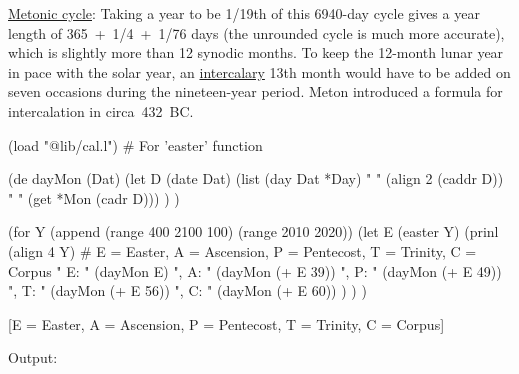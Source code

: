 \begin{itemize}
\href{http://en.wikipedia.org/wiki/Metonic\_cycle}{Metonic cycle}:
Taking a year to be 1/19th of this 6940-day cycle gives a year length of
365~+~1/4~+~1/76 days (the unrounded cycle is much more accurate), which
is slightly more than 12 synodic months. To keep the 12-month lunar year
in pace with the solar year, an
\href{http://en.wikipedia.org/wiki/intercalary}{intercalary} 13th month
would have to be added on seven occasions during the nineteen-year
period. Meton introduced a formula for intercalation in circa~432~BC.


\begin{wideverbatim}

(load "@lib/cal.l")  # For 'easter' function

(de dayMon (Dat)
   (let D (date Dat)
      (list (day Dat *Day) " " (align 2 (caddr D)) " " (get *Mon (cadr D))) ) )

(for Y (append (range 400 2100 100) (range 2010 2020))
   (let E (easter Y)
      (prinl
         (align 4 Y)
         # E = Easter, A = Ascension, P = Pentecost, T = Trinity, C = Corpus
         " E: " (dayMon E)
         ", A: " (dayMon (+ E 39))
         ", P: " (dayMon (+ E 49))
         ", T: " (dayMon (+ E 56))
         ", C: " (dayMon (+ E 60)) ) ) )

\end{wideverbatim}

\begin{wideverbatim}

[E = Easter, A = Ascension, P = Pentecost, T = Trinity, C = Corpus]

Output:


\end{wideverbatim}
\end{itemize}
